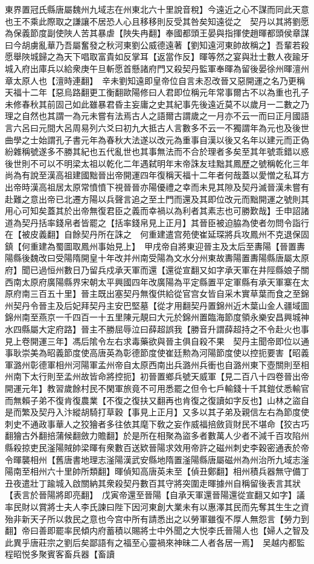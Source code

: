 東界置冠氏縣唐屬魏州九域志在州東北六十里說音稅】今遠近之心不謀而同此天意也王不乘此際取之謙讓不居恐人心且移移則反受其咎矣知遠從之　契丹以其將劉愿為保義節度副使陜人苦其暴虐【陜失冉翻】奉國都頭王晏與指揮使趙暉都頭侯章謀曰今胡虜亂華乃吾屬奮發之秋河東劉公威德遠著【劉知遠河東帥故稱之】吾輩若殺愿舉陜城歸之為天下唱取富貴如反掌耳【返當作反】暉等然之宴與壯士數人夜踰牙城入府出庫兵以給衆庚午旦斬愿首懸諸府門又殺契丹監軍奉暉為留後晏徐州暉澶州章太原人也【澶時連翻】　辛未劉知遠即皇帝位自言未忍改晉又惡開運之名乃更稱天福十二年【惡烏路翻更工衡翻歐陽修曰人君即位稱元年常事爾古不以為重也孔子未修春秋其前固己如此雖暴君昏主妄庸之史其紀事先後遠近莫不以歲月一二數之乃理之自然也其謂一為元未嘗有法焉古人之語爾古謂歲之一月亦不云一而曰正月國語言六呂曰元間大呂周易列六爻曰初九大抵古人言數多不云一不獨謂年為元也及後世曲學之士始謂孔子書元年為春秋大法遂以改元為重事自漢以後又名年以建元而正偽紛雜稱號遂多不勝其紀也五代亂世也其事無法而不合於理者多矣至其年號乖錯以惑後世則不可以不明梁太祖以乾化二年遇弑明年末帝誅友珪黜其鳳歷之號稱乾化三年尚為有說至漢高祖建國黜晉出帝開運四年復稱天福十二年者何哉蓋以愛憎之私耳方出帝時漢高祖居太原常憤憤下視晉晉亦陽優禮之幸而未見其隙及契丹滅晉漢未嘗有赴難之意出帝已北遷方陽以兵聲言追之至土門而還及其即位改元而黜開運之號則其用心可知矣蓋其於出帝無復君臣之義而幸禍以為利者其素志也可勝歎哉】壬申詔諸道為契丹括率錢帛者皆罷之【括率錢帛見上正月】其晉臣被迫脇為使者勿問令詣行在【被皮義翻】自餘契丹所在誅之　何重建遣宫苑使崔延琛將兵攻鳳州不克退保固鎮【何重建為蜀圖取鳳州事始見上】　甲戌帝自將東迎晉主及太后至夀陽【晉置夀陽縣後魏改曰受陽隋開皇十年改并州南受陽為文水分州東故夀陽置夀陽縣唐屬太原府】聞已過恒州數日乃留兵戍承天軍而還【還從宣翻又如字承天軍在井陘縣娘子關西南太原府廣陽縣界宋朝太平興國四年改廣陽為平定縣置平定軍縣有承天軍寨在太原府南三百五十里】晉主既出塞契丹無復供給從官宫女皆自采木實草葉而食之至錦州契丹令晉主及后妃拜契丹主安巴堅墓【從才用翻契丹置錦州近木葉山金人疆域圖錦州南至燕京一千四百一十五里陳元靚曰大元於錦州置臨海節度領永樂安昌興城神水四縣屬大定府路】晉主不勝屈辱泣曰薛超誤我【勝音升謂薛超持之不令赴火也事見上卷開運三年】馮后隂令左右求毒藥欲與晉主俱自殺不果　契丹主聞帝即位以通事耿崇美為昭義節度使高唐英為彰德節度使崔廷勲為河陽節度使以控扼要害【昭義軍潞州彰德軍相州河陽軍孟州帝自太原西南出兵潞州兵衝也自潞州東下壺關則至相州南下太行則至孟州故皆命將控扼】初晉置鄉兵號天威軍【見二百八十四卷晉出帝開運元年】教習歲餘村民不閑軍旅竟不可用悉罷之但令七戶輸錢十千其鎧仗悉輸官而無賴子弟不復肯復農業【不復之復扶又翻再也肯復之復讀如字反也】山林之盜自是而繁及契丹入汴縱胡騎打草穀【事見上正月】又多以其子弟及親信左右為節度使刺史不通政事華人之狡獪者多往依其麾下敎之妄作威福掊斂貨財民不堪命【狡古巧翻獪古外翻掊蒲候翻斂力贍翻】於是所在相聚為盜多者數萬人少者不減千百攻陷州縣殺掠吏民滏陽賊帥梁暉有衆數百送欵晉陽求效用帝許之磁州刺史李穀密通表於帝令暉襲相州【舊唐書地理志滏陽漢武安縣地隋置滏陽縣唐屬磁州為州治所九域志滏陽南至相州六十里帥所類翻】暉偵知高唐英未至【偵丑鄭翻】相州積兵器無守備丁丑夜遣壯丁踰城入啟關納其衆殺契丹數百其守將突圍走暉據州自稱留後表言其狀【表言於晉陽將即亮翻】　戊寅帝還至晉陽【自承天軍還晉陽還從宣翻又如字】議率民財以賞將士夫人李氏諫曰陛下因河東創大業未有以惠澤其民而先奪其生生之資殆非新天子所以救民之意也今宫中所有請悉出之以勞軍雖復不厚人無怨言【勞力到翻】帝曰善即罷率民傾内府蓄積以賜將士中外聞之大悦李氏晉陽人也【婦人之智及此異乎唐莊宗之劉后矣鄙語有之福至心靈禍來神昧二人者各居一焉】　吴越内都監程昭悦多聚賓客畜兵器【畜讀